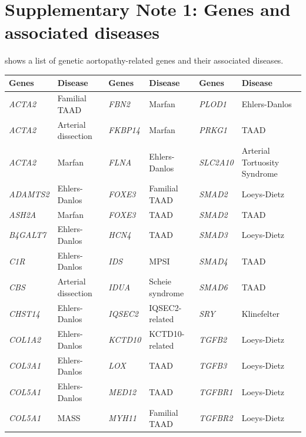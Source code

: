 \documentclass[fleqn,10pt]{wlscirep}
\begin{document}
\renewcommand{\tablename}{Supplementary Table}
\setcounter{table}{0}  %


\section*{Supplementary Note 1: Genes and associated diseases}
 shows a list of genetic aortopathy-related genes and their associated diseases. 
\begin{table}[h]
    \centering
    \renewcommand{\arraystretch}{1.2} %
    \begin{tabular}{l l | l l | l l}
        \toprule
        \textbf{Genes} & \textbf{Disease} & \textbf{Genes} & \textbf{Disease} & \textbf{Genes} & \textbf{Disease} \\
        \midrule
        \textit{ACTA2} & Familial TAAD & \textit{FBN2} & Marfan & \textit{PLOD1} & Ehlers-Danlos \\
        \textit{ACTA2} & Arterial dissection & \textit{FKBP14} & Marfan & \textit{PRKG1} & TAAD \\
        \textit{ACTA2} & Marfan & \textit{FLNA} & Ehlers-Danlos & \textit{SLC2A10} & Arterial Tortuosity Syndrome \\
        \textit{ADAMTS2} & Ehlers-Danlos & \textit{FOXE3} & Familial TAAD & \textit{SMAD2} & Loeys-Dietz \\
        \textit{ASH2A} & Marfan & \textit{FOXE3} & TAAD & \textit{SMAD2} & TAAD \\
        \textit{B4GALT7} & Ehlers-Danlos & \textit{HCN4} & TAAD & \textit{SMAD3} & Loeys-Dietz \\
        \textit{C1R} & Ehlers-Danlos & \textit{IDS} & MPSI & \textit{SMAD4} & TAAD \\
        \textit{CBS} & Arterial dissection & \textit{IDUA} & Scheie syndrome & \textit{SMAD6} & TAAD \\
        \textit{CHST14} & Ehlers-Danlos & \textit{IQSEC2} & IQSEC2-related & \textit{SRY} & Klinefelter \\
        \textit{COL1A2} & Ehlers-Danlos & \textit{KCTD10} & KCTD10-related & \textit{TGFB2} & Loeys-Dietz \\
        \textit{COL3A1} & Ehlers-Danlos & \textit{LOX} & TAAD & \textit{TGFB3} & Loeys-Dietz \\
        \textit{COL5A1} & Ehlers-Danlos & \textit{MED12} & TAAD & \textit{TGFBR1} & Loeys-Dietz \\
        \textit{COL5A1} & MASS & \textit{MYH11} & Familial TAAD & \textit{TGFBR2} & Loeys-Dietz \\

\end{tabular}
\end{table}
\end{document}
